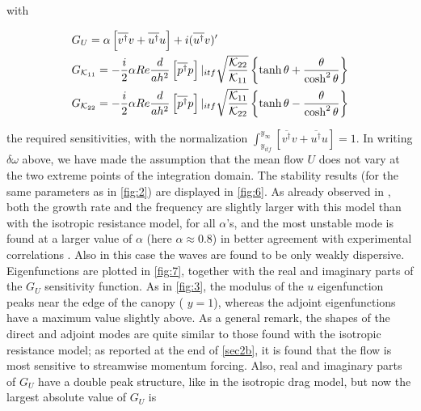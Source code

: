 with

\begin{equation}
\begin{split}
& G_U = \alpha  \left[  \overline{v^{\dagger}} v +  \overline{u^{\dagger}} u \right] + i ( \overline{u^{\dagger}} v)'  \vspace{0.3cm}\\
& G_{\mathcal{K}_{11}} = -\dfrac{i}{2} \alpha Re \dfrac{d}{a h^2}  \left[  \overline{p^{\dagger}} p \right]|_{itf} \sqrt{\dfrac{\mathcal{K}_{22}}{\mathcal{K}_{11}}} \left\lbrace \tanh \theta + \dfrac{\theta}{\cosh^2 \theta}\right\rbrace	\vspace{0.3cm}\\
& G_{\mathcal{K}_{22}} = -\dfrac{i}{2} \alpha Re \dfrac{d}{a h^2}  \left[  \overline{p^{\dagger}} p \right]|_{itf} \sqrt{\dfrac{\mathcal{K}_{11}}{\mathcal{K}_{22}}} \left\lbrace \tanh \theta - \dfrac{\theta}{\cosh^2 \theta}\right\rbrace
\end{split}
\end{equation}


the required sensitivities, with the normalization  $\int_{y_{itf}}^{y_{\infty}} \left[  \overline{v^{\dagger}} v +  \overline{u^{\dagger}} u \right] = 1$.
In writing $\delta \omega$ above, we have made the assumption that the mean flow $U$ does not vary at the two extreme points of the
integration domain.
The stability results (for the same parameters as in \ref{fig:2}) are displayed in \ref{fig:6}. As already
observed in \citet{zampogna2016instability}, both the growth rate and the frequency are slightly larger with this model than
with the isotropic resistance model, for all $\alpha$’s, and the most unstable mode is found at a larger
value of $\alpha$ (here $\alpha \approx 0.8$) in better agreement with experimental correlations \citet{zampogna2016instability} \citet{raupach1996coherent}.  Also in this case the
waves are found to be only weakly dispersive.
Eigenfunctions are plotted in \ref{fig:7}, together with the real and imaginary parts of the $G_U$
sensitivity function. As in \ref{fig:3}, the modulus of the $u$ eigenfunction peaks near the edge of the
canopy ( $y = 1$), whereas the adjoint eigenfunctions have a maximum value slightly above. As a
general remark, the shapes of the direct and adjoint modes are quite similar to those found with
the isotropic resistance model; as reported at the end of \ref{sec2b}, it is found that the flow
is most sensitive to streamwise momentum forcing. Also, real and imaginary parts of $G_U$ have a
double peak structure, like in the isotropic drag model, but now the largest absolute value of $G_U$ is

